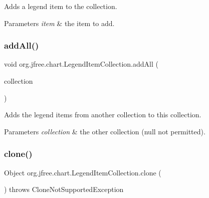 Adds a legend item to the collection.


\begin{DoxyParams}{Parameters}
{\em item} & the item to add. \\
\hline
\end{DoxyParams}
\mbox{\label{classorg_1_1jfree_1_1chart_1_1_legend_item_collection_a2ac6bfa2369ab053474d03d90c86d822}} 
\subsubsection{\texorpdfstring{add\+All()}{addAll()}}
{\footnotesize\ttfamily void org.\+jfree.\+chart.\+Legend\+Item\+Collection.\+add\+All (\begin{DoxyParamCaption}\item[{\mbox{\hyperlink{classorg_1_1jfree_1_1chart_1_1_legend_item_collection}{Legend\+Item\+Collection}}}]{collection }\end{DoxyParamCaption})}

Adds the legend items from another collection to this collection.


\begin{DoxyParams}{Parameters}
{\em collection} & the other collection ({\ttfamily null} not permitted). \\
\hline
\end{DoxyParams}
\mbox{\label{classorg_1_1jfree_1_1chart_1_1_legend_item_collection_a242722dd9371d7cca6dd5d0b4e7b25b2}} 
\subsubsection{\texorpdfstring{clone()}{clone()}}
{\footnotesize\ttfamily Object org.\+jfree.\+chart.\+Legend\+Item\+Collection.\+clone (\begin{DoxyParamCaption}{ }\end{DoxyParamCaption}) throws Clone\+Not\+Supported\+Exception}

